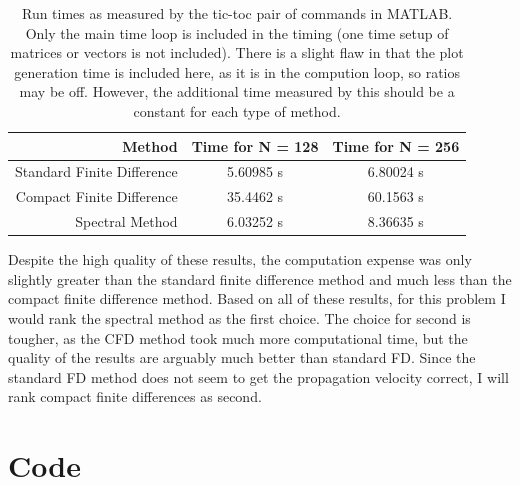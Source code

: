 \documentclass{article}
\begin{document}
\begin{table}[!ht]
\centering
\caption{Run times as measured by the tic-toc pair of commands in MATLAB.
Only the main time loop is included in the timing (one time setup of matrices or vectors is not included).
There is a slight flaw in that the plot generation time is included here, as it is in the compution loop, so ratios may be off.
However, the additional time measured by this should be a constant for each type of method.}
\label{tbl:runtime}
\begin{tabular}{r | c c}
Method & Time for N = 128 & Time for N = 256 \\
\midrule
Standard Finite Difference & 5.60985 s & 6.80024 s \\
Compact Finite Difference & 35.4462 s & 60.1563 s \\
Spectral Method & 6.03252 s & 8.36635 s
\end{tabular}
\end{table}

Despite the high quality of these results, the computation expense was only slightly greater than the standard finite difference method and much less than the compact finite difference method.
Based on all of these results, for this problem I would rank the spectral method as the first choice.
The choice for second is tougher, as the CFD method took much more computational time, but the quality of the results are arguably much better than standard FD.
Since the standard FD method does not seem to get the propagation velocity correct, I will rank compact finite differences as second.

\clearpage
\appendix
\section{Code}




\end{document}
